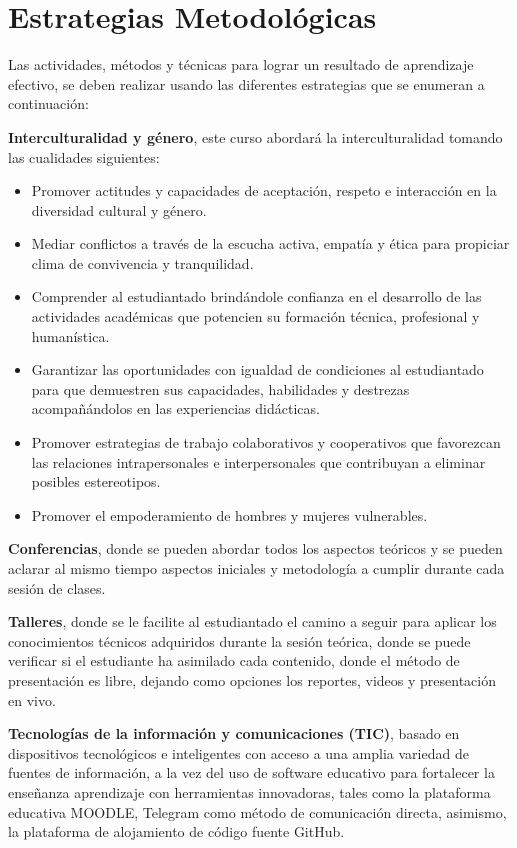 \section{Estrategias Metodológicas}

Las actividades, métodos y técnicas para lograr un resultado de aprendizaje efectivo, se deben realizar usando las diferentes estrategias que se enumeran a continuación:

\textbf{Interculturalidad y género}, este curso abordará la interculturalidad tomando las cualidades siguientes:\

\begin{itemize}
    \item Promover actitudes y capacidades de aceptación, respeto e interacción en la diversidad cultural y género.
    \item Mediar conflictos a través de la escucha activa, empatía y ética para propiciar clima de convivencia y tranquilidad.
    \item Comprender al estudiantado brindándole confianza en el desarrollo de las actividades académicas que potencien su formación técnica, profesional y humanística.
    \item Garantizar las oportunidades con igualdad de condiciones al estudiantado para que demuestren sus capacidades, habilidades y destrezas acompañándolos en las experiencias didácticas.
    \item Promover estrategias de trabajo colaborativos y cooperativos que favorezcan las relaciones intrapersonales e interpersonales que contribuyan a eliminar posibles estereotipos.
    \item Promover el empoderamiento de hombres y mujeres vulnerables.
\end{itemize}

\textbf{Conferencias}, donde se pueden abordar todos los aspectos teóricos y se pueden aclarar al mismo tiempo aspectos iniciales y metodología a cumplir durante cada sesión de clases.

\textbf{Talleres}, donde se le facilite al estudiantado el camino a seguir para aplicar los conocimientos técnicos adquiridos durante la sesión teórica, donde se puede verificar si el estudiante ha asimilado cada contenido, donde el método de presentación es libre, dejando como opciones los reportes, videos y presentación en vivo.

\textbf{Tecnologías de la información y comunicaciones (TIC)}, basado en dispositivos tecnológicos e inteligentes con acceso a una amplia variedad de fuentes de información, a la vez del uso de software educativo para fortalecer la enseñanza aprendizaje con herramientas innovadoras, tales como la plataforma educativa MOODLE, Telegram como método de comunicación directa, asimismo, la plataforma de alojamiento de código fuente GitHub.

